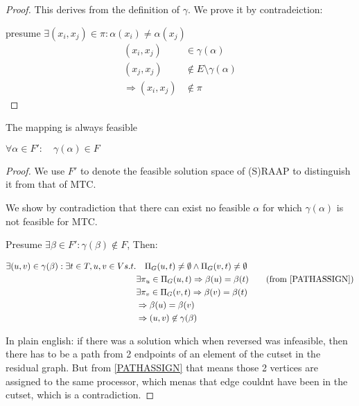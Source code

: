 \documentclass{article}
\begin{document}
\begin{proof}
This derives from the definition of $\gamma$.
We prove it by contradeiction:

presume $\exists (x_i, x_j) \in \pi : \alpha(x_i) \neq \alpha(x_j)$
\begin{align}
	\nonumber (x_i, x_j) & \in \gamma(\alpha) \\
	\nonumber (x_j, x_j) & \not\in E \setminus \gamma(\alpha) \\
	\nonumber \Rightarrow (x_i, x_j) & \not\in \pi
\end{align}

\end{proof}

\begin{lemma}
The mapping is always feasible

$\forall \alpha \in F' : \quad \gamma(\alpha) \in F$
\end{lemma}

\begin{proof}
We use $F'$ to denote the feasible solution space of (S)RAAP to distinguish it from that of MTC.

We show by contradiction that there can exist no feasible $\alpha$ for which $\gamma (\alpha)$ is not feasible for MTC.

Presume $\exists \beta \in F' : \gamma(\beta) \not\in F$, Then:

\begin{align}
	\nonumber \exists (u,v) \in \gamma(\beta) : \exists t \in T, u, v \in V s.t. & \quad \Pi_G (u, t) \neq \emptyset \wedge \Pi_G (v, t) \neq \emptyset \\
	\nonumber & \exists \pi_u \in \Pi_G (u, t) \Rightarrow \beta(u) = \beta(t) \quad \quad \mbox{(from \ref{PATHASSIGN})}\\
	\nonumber & \exists \pi_v \in \Pi_G (v, t) \Rightarrow \beta(v) = \beta(t) \\
	\nonumber & \Rightarrow \beta(u) = \beta(v) \\
	\nonumber & \Rightarrow (u,v) \not\in \gamma(\beta)
\end{align}

In plain english: if there was a solution which when reversed was infeasible, then there has to be a path from 2 endpoints of an element of the cutset in the residual graph.
But from \ref{PATHASSIGN} that means those 2 vertices are assigned to the same processor, which menas that edge couldnt have been in the cutset, which is a contradiction.
\end{proof}



\end{document}
